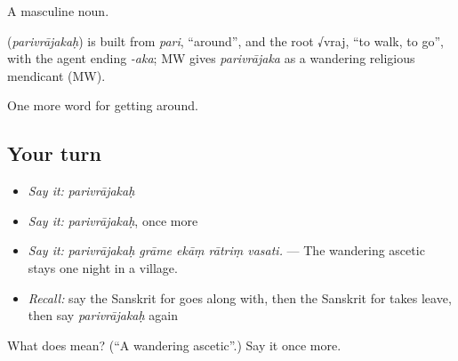 A masculine noun.

\begin{cousinweb}
\textbf{} (\emph{parivrājakaḥ}) is built from \emph{pari}, \textquotedblleft{}around\textquotedblright{}, and the root √vraj, \textquotedblleft{}to walk, to go\textquotedblright{}, with the agent ending \emph{-aka}; MW gives \emph{parivrājaka} as a wandering religious mendicant (MW).
\end{cousinweb}

\begin{grammarlens}[title={What you've built}]
One more word for getting around.
\end{grammarlens}

\subsection*{Your turn}
\begin{itemize}
\raggedright
  \item \emph{Say it:} \emph{parivrājakaḥ}
  \item \emph{Say it:} \emph{parivrājakaḥ}, once more
  \item \emph{Say it:} \emph{parivrājakaḥ grāme ekāṃ rātriṃ vasati.} — The wandering ascetic stays one night in a village.
  \item \emph{Recall:} say the Sanskrit for goes along with, then the Sanskrit for takes leave, then say \emph{parivrājakaḥ} again
\end{itemize}

\begin{tcolorbox}[breakable,colback=teal!4,colframe=teal!35!black,title={Before you move on}]
What does  mean? (\textquotedblleft{}A wandering ascetic\textquotedblright{}.) Say it once more.
\end{tcolorbox}
